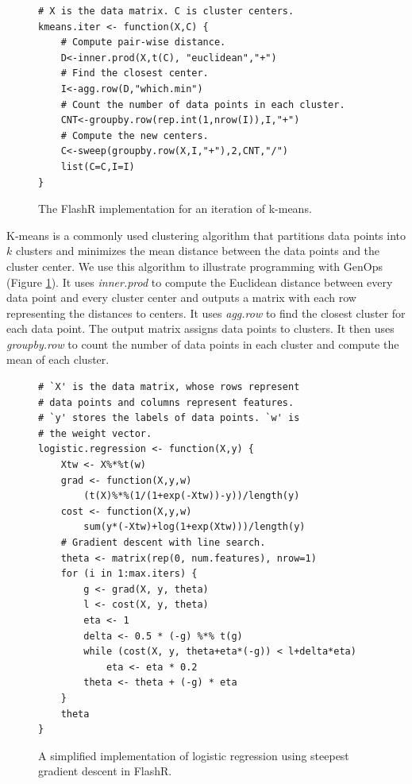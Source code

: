 \begin{figure}
\centering
\begin{verbatim}
# X is the data matrix. C is cluster centers.
kmeans.iter <- function(X,C) {
	# Compute pair-wise distance.
	D<-inner.prod(X,t(C), "euclidean","+")
	# Find the closest center.
	I<-agg.row(D,"which.min")
	# Count the number of data points in each cluster.
	CNT<-groupby.row(rep.int(1,nrow(I)),I,"+")
	# Compute the new centers.
	C<-sweep(groupby.row(X,I,"+"),2,CNT,"/")
	list(C=C,I=I)
}
\end{verbatim}
\vspace{-10pt}
	\caption{The FlashR implementation for an iteration of k-means.}
	\label{fig:kmeans}
\vspace{-10pt}
\end{figure}

K-means is a commonly used clustering algorithm that partitions data points
into $k$ clusters and minimizes the mean distance between the data points and
the cluster center. We use this algorithm to illustrate programming with GenOps
(Figure \ref{fig:kmeans}). It uses \textit{inner.prod} to
compute the Euclidean distance between every data point and every cluster center
and outputs a matrix with each row representing the distances to centers.  
It uses \textit{agg.row} to find the closest
cluster for each data point.  The output matrix 
assigns data points to clusters. It then uses \textit{groupby.row} to count
the number of data points in each cluster and compute the mean of each cluster.

\begin{figure}
\begin{verbatim}
# `X' is the data matrix, whose rows represent
# data points and columns represent features.
# `y' stores the labels of data points. `w' is
# the weight vector.
logistic.regression <- function(X,y) {
	Xtw <- X%*%t(w)
	grad <- function(X,y,w)
		(t(X)%*%(1/(1+exp(-Xtw))-y))/length(y)
	cost <- function(X,y,w)
		sum(y*(-Xtw)+log(1+exp(Xtw)))/length(y)
	# Gradient descent with line search.
	theta <- matrix(rep(0, num.features), nrow=1)
	for (i in 1:max.iters) {
		g <- grad(X, y, theta)
		l <- cost(X, y, theta)
		eta <- 1
		delta <- 0.5 * (-g) %*% t(g)
		while (cost(X, y, theta+eta*(-g)) < l+delta*eta)
			eta <- eta * 0.2
		theta <- theta + (-g) * eta
	}
	theta
}
\end{verbatim}
\vspace{-10pt}
\caption{A simplified implementation of logistic regression using
steepest gradient descent in FlashR.}
\label{logistic}
\vspace{-5pt}
\end{figure}

